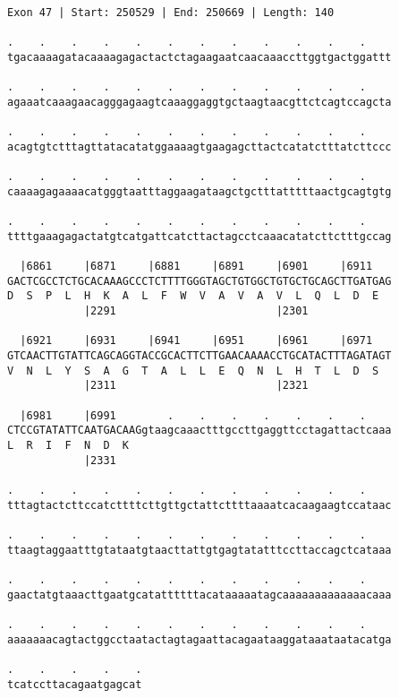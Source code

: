 \documentclass{article}
\begin{document}
\begin{Verbatim}
Exon 47 | Start: 250529 | End: 250669 | Length: 140
 
.    .    .    .    .    .    .    .    .    .    .    .    
tgacaaaagatacaaaagagactactctagaagaatcaacaaaccttggtgactggattt
  
.    .    .    .    .    .    .    .    .    .    .    .    
agaaatcaaagaacagggagaagtcaaaggaggtgctaagtaacgttctcagtccagcta
  
.    .    .    .    .    .    .    .    .    .    .    .    
acagtgtctttagttatacatatggaaaagtgaagagcttactcatatctttatcttccc
  
.    .    .    .    .    .    .    .    .    .    .    .    
caaaagagaaaacatgggtaatttaggaagataagctgctttatttttaactgcagtgtg
  
.    .    .    .    .    .    .    .    .    .    .    .    
ttttgaaagagactatgtcatgattcatcttactagcctcaaacatatcttctttgccag
  
  |6861     |6871     |6881     |6891     |6901     |6911   
GACTCGCCTCTGCACAAAGCCCTCTTTTGGGTAGCTGTGGCTGTGCTGCAGCTTGATGAG
D  S  P  L  H  K  A  L  F  W  V  A  V  A  V  L  Q  L  D  E  
            |2291                         |2301             
  
  |6921     |6931     |6941     |6951     |6961     |6971   
GTCAACTTGTATTCAGCAGGTACCGCACTTCTTGAACAAAACCTGCATACTTTAGATAGT
V  N  L  Y  S  A  G  T  A  L  L  E  Q  N  L  H  T  L  D  S  
            |2311                         |2321             
  
  |6981     |6991        .    .    .    .    .    .    .    
CTCCGTATATTCAATGACAAGgtaagcaaactttgccttgaggttcctagattactcaaa
L  R  I  F  N  D  K                                         
            |2331                                           
  
.    .    .    .    .    .    .    .    .    .    .    .    
tttagtactcttccatcttttcttgttgctattcttttaaaatcacaagaagtccataac
  
.    .    .    .    .    .    .    .    .    .    .    .    
ttaagtaggaatttgtataatgtaacttattgtgagtatatttccttaccagctcataaa
  
.    .    .    .    .    .    .    .    .    .    .    .    
gaactatgtaaacttgaatgcatattttttacataaaaatagcaaaaaaaaaaaaacaaa
  
.    .    .    .    .    .    .    .    .    .    .    .    
aaaaaaacagtactggcctaatactagtagaattacagaataaggataaataatacatga
  
.    .    .    .    .
tcatccttacagaatgagcat
\end{Verbatim}
\newpage
\end{document}
